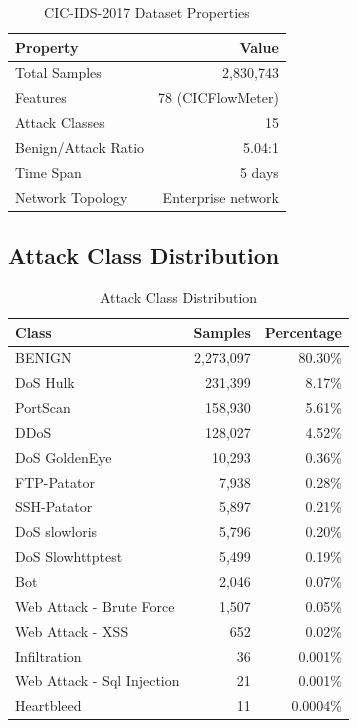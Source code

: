 \documentclass[12pt,a4paper]{article}
\begin{document}
\begin{table}[H]
\centering
\caption{CIC-IDS-2017 Dataset Properties}
\label{tab:dataset_properties}
\begin{tabular}{|l|r|}
\hline
\textbf{Property} & \textbf{Value} \\
\hline
Total Samples & 2,830,743 \\
Features & 78 (CICFlowMeter) \\
Attack Classes & 15 \\
Benign/Attack Ratio & 5.04:1 \\
Time Span & 5 days \\
Network Topology & Enterprise network \\
\hline
\end{tabular}
\end{table}

\subsection{Attack Class Distribution}

\begin{table}[H]
\centering
\caption{Attack Class Distribution}
\label{tab:attack_distribution}
\begin{tabular}{|l|r|r|}
\hline
\textbf{Class} & \textbf{Samples} & \textbf{Percentage} \\
\hline
BENIGN & 2,273,097 & 80.30\% \\
DoS Hulk & 231,399 & 8.17\% \\
PortScan & 158,930 & 5.61\% \\
DDoS & 128,027 & 4.52\% \\
DoS GoldenEye & 10,293 & 0.36\% \\
FTP-Patator & 7,938 & 0.28\% \\
SSH-Patator & 5,897 & 0.21\% \\
DoS slowloris & 5,796 & 0.20\% \\
DoS Slowhttptest & 5,499 & 0.19\% \\
Bot & 2,046 & 0.07\% \\
Web Attack - Brute Force & 1,507 & 0.05\% \\
Web Attack - XSS & 652 & 0.02\% \\
Infiltration & 36 & 0.001\% \\
Web Attack - Sql Injection & 21 & 0.001\% \\
Heartbleed & 11 & 0.0004\% \\
\hline
\end{tabular}
\end{table}
\end{document}
